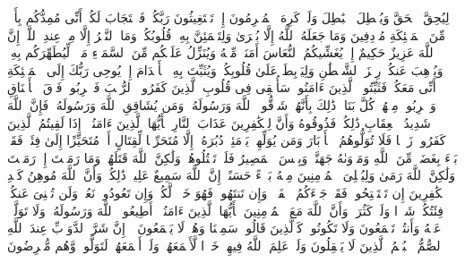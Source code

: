 \stopbuffer%
\startbuffer[\q:8:8]
لِیُحِقَّ ٱلۡحَقَّ وَیُبۡطِلَ ٱلۡبَٰطِلَ وَلَوۡ كَرِهَ ٱلۡمُجۡرِمُونَ%
\stopbuffer%
\startbuffer[\q:8:9]
إِذۡ تَسۡتَغِیثُونَ رَبَّكُمۡ فَٱسۡتَجَابَ لَكُمۡ أَنِّی مُمِدُّكُم بِأَلۡفࣲ مِّنَ ٱلۡمَلَٰۤئِكَةِ مُرۡدِفِینَ%
\stopbuffer%
\startbuffer[\q:8:10]
وَمَا جَعَلَهُ ٱللَّهُ إِلَّا بُشۡرَىٰ وَلِتَطۡمَئِنَّ بِهِۦ قُلُوبُكُمۡۚ وَمَا ٱلنَّصۡرُ إِلَّا مِنۡ عِندِ ٱللَّهِۚ إِنَّ ٱللَّهَ عَزِیزٌ حَكِیمٌ%
\stopbuffer%
\startbuffer[\q:8:11]
إِذۡ یُغَشِّیكُمُ ٱلنُّعَاسَ أَمَنَةࣰ مِّنۡهُ وَیُنَزِّلُ عَلَیۡكُم مِّنَ ٱلسَّمَاۤءِ مَاۤءࣰ لِّیُطَهِّرَكُم بِهِۦ وَیُذۡهِبَ عَنكُمۡ رِجۡزَ ٱلشَّیۡطَٰنِ وَلِیَرۡبِطَ عَلَىٰ قُلُوبِكُمۡ وَیُثَبِّتَ بِهِ ٱلۡأَقۡدَامَ%
\stopbuffer%
\startbuffer[\q:8:12]
إِذۡ یُوحِی رَبُّكَ إِلَى ٱلۡمَلَٰۤئِكَةِ أَنِّی مَعَكُمۡ فَثَبِّتُوا۟ ٱلَّذِینَ ءَامَنُوا۟ۚ سَأُلۡقِی فِی قُلُوبِ ٱلَّذِینَ كَفَرُوا۟ ٱلرُّعۡبَ فَٱضۡرِبُوا۟ فَوۡقَ ٱلۡأَعۡنَاقِ وَٱضۡرِبُوا۟ مِنۡهُمۡ كُلَّ بَنَانࣲ%
\stopbuffer%
\startbuffer[\q:8:13]
ذَٰلِكَ بِأَنَّهُمۡ شَاۤقُّوا۟ ٱللَّهَ وَرَسُولَهُۥۚ وَمَن یُشَاقِقِ ٱللَّهَ وَرَسُولَهُۥ فَإِنَّ ٱللَّهَ شَدِیدُ ٱلۡعِقَابِ%
\stopbuffer%
\startbuffer[\q:8:14]
ذَٰلِكُمۡ فَذُوقُوهُ وَأَنَّ لِلۡكَٰفِرِینَ عَذَابَ ٱلنَّارِ%
\stopbuffer%
\startbuffer[\q:8:15]
یَٰۤأَیُّهَا ٱلَّذِینَ ءَامَنُوۤا۟ إِذَا لَقِیتُمُ ٱلَّذِینَ كَفَرُوا۟ زَحۡفࣰا فَلَا تُوَلُّوهُمُ ٱلۡأَدۡبَارَ%
\stopbuffer%
\startbuffer[\q:8:16]
وَمَن یُوَلِّهِمۡ یَوۡمَئِذࣲ دُبُرَهُۥۤ إِلَّا مُتَحَرِّفࣰا لِّقِتَالٍ أَوۡ مُتَحَیِّزًا إِلَىٰ فِئَةࣲ فَقَدۡ بَاۤءَ بِغَضَبࣲ مِّنَ ٱللَّهِ وَمَأۡوَىٰهُ جَهَنَّمُۖ وَبِئۡسَ ٱلۡمَصِیرُ%
\stopbuffer%
\startbuffer[\q:8:17]
فَلَمۡ تَقۡتُلُوهُمۡ وَلَٰكِنَّ ٱللَّهَ قَتَلَهُمۡۚ وَمَا رَمَیۡتَ إِذۡ رَمَیۡتَ وَلَٰكِنَّ ٱللَّهَ رَمَىٰ وَلِیُبۡلِیَ ٱلۡمُؤۡمِنِینَ مِنۡهُ بَلَاۤءً حَسَنًاۚ إِنَّ ٱللَّهَ سَمِیعٌ عَلِیمࣱ%
\stopbuffer%
\startbuffer[\q:8:18]
ذَٰلِكُمۡ وَأَنَّ ٱللَّهَ مُوهِنُ كَیۡدِ ٱلۡكَٰفِرِینَ%
\stopbuffer%
\startbuffer[\q:8:19]
إِن تَسۡتَفۡتِحُوا۟ فَقَدۡ جَاۤءَكُمُ ٱلۡفَتۡحُۖ وَإِن تَنتَهُوا۟ فَهُوَ خَیۡرࣱ لَّكُمۡۖ وَإِن تَعُودُوا۟ نَعُدۡ وَلَن تُغۡنِیَ عَنكُمۡ فِئَتُكُمۡ شَیۡءࣰا وَلَوۡ كَثُرَتۡ وَأَنَّ ٱللَّهَ مَعَ ٱلۡمُؤۡمِنِینَ%
\stopbuffer%
\startbuffer[\q:8:20]
یَٰۤأَیُّهَا ٱلَّذِینَ ءَامَنُوۤا۟ أَطِیعُوا۟ ٱللَّهَ وَرَسُولَهُۥ وَلَا تَوَلَّوۡا۟ عَنۡهُ وَأَنتُمۡ تَسۡمَعُونَ%
\stopbuffer%
\startbuffer[\q:8:21]
وَلَا تَكُونُوا۟ كَٱلَّذِینَ قَالُوا۟ سَمِعۡنَا وَهُمۡ لَا یَسۡمَعُونَ%
\stopbuffer%
\startbuffer[\q:8:22]
۞ إِنَّ شَرَّ ٱلدَّوَاۤبِّ عِندَ ٱللَّهِ ٱلصُّمُّ ٱلۡبُكۡمُ ٱلَّذِینَ لَا یَعۡقِلُونَ%
\stopbuffer%
\startbuffer[\q:8:23]
وَلَوۡ عَلِمَ ٱللَّهُ فِیهِمۡ خَیۡرࣰا لَّأَسۡمَعَهُمۡۖ وَلَوۡ أَسۡمَعَهُمۡ لَتَوَلَّوا۟ وَّهُم مُّعۡرِضُونَ%
